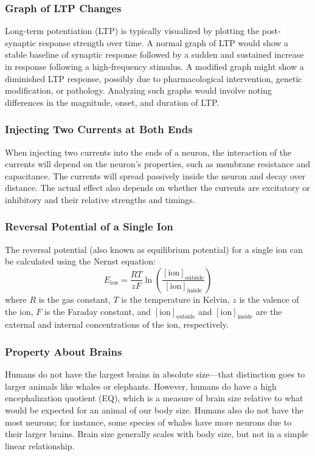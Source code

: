 \documentclass{article}
\begin{document}
\subsubsection*{Graph of LTP Changes}
Long-term potentiation (LTP) is typically visualized by plotting the post-synaptic response strength over time. A normal graph of LTP would show a stable baseline of synaptic response followed by a sudden and sustained increase in response following a high-frequency stimulus. A modified graph might show a diminished LTP response, possibly due to pharmacological intervention, genetic modification, or pathology. Analyzing such graphs would involve noting differences in the magnitude, onset, and duration of LTP.

\subsubsection*{Injecting Two Currents at Both Ends}
When injecting two currents into the ends of a neuron, the interaction of the currents will depend on the neuron's properties, such as membrane resistance and capacitance. The currents will spread passively inside the neuron and decay over distance. The actual effect also depends on whether the currents are excitatory or inhibitory and their relative strengths and timings.

\subsubsection*{Reversal Potential of a Single Ion}
The reversal potential (also known as equilibrium potential) for a single ion can be calculated using the Nernst equation:
\[
E_{\text{ion}} = \frac{RT}{zF} \ln\left(\frac{[\text{ion}]_{\text{outside}}}{[\text{ion}]_{\text{inside}}}\right)
\]
where \(R\) is the gas constant, \(T\) is the temperature in Kelvin, \(z\) is the valence of the ion, \(F\) is the Faraday constant, and \([\text{ion}]_{\text{outside}}\) and \([\text{ion}]_{\text{inside}}\) are the external and internal concentrations of the ion, respectively.

\subsubsection*{Property About Brains}
Humans do not have the largest brains in absolute size—that distinction goes to larger animals like whales or elephants. However, humans do have a high encephalization quotient (EQ), which is a measure of brain size relative to what would be expected for an animal of our body size. Humans also do not have the most neurons; for instance, some species of whales have more neurons due to their larger brains. Brain size generally scales with body size, but not in a simple linear relationship.
\end{document}
